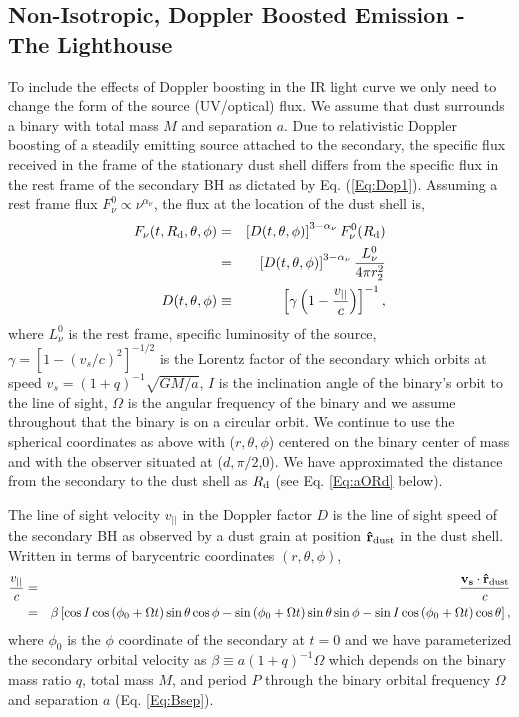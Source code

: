 \subsection{Non-Isotropic, Doppler Boosted Emission - The Lighthouse} 
To include the effects of Doppler boosting in the IR light
curve we only need to change the form of the source (UV/optical) flux. We assume that dust surrounds a
binary with total mass $M$ and separation $a$. Due to relativistic Doppler
boosting of a steadily emitting source attached to the secondary, the specific
flux received in the frame of the stationary dust shell differs from the
specific flux in the rest frame of the secondary BH as dictated by Eq.
(\ref{Eq:Dop1}). Assuming a rest frame flux $F^0_{\nu} \propto
\nu^{\alpha_{\nu}}$, the flux at the location of the dust shell is,
\begin{eqnarray}
F_{\nu}(t, R_{\rm{d}}, \theta, \phi) &=& \left[D(t, \theta, \phi)\right]^{3-\alpha_{\nu}} F^0_{\nu}(R_{\rm{d}})  \nonumber \\
&=&  \left[D(t, \theta, \phi)\right]^{3-\alpha_{\nu}} \frac{L^0_{\nu}}{4 \pi r^2_2}  \\ \nonumber
D(t, \theta, \phi) &\equiv& \left[ \gamma \left(1 - \frac{v_{||}}{c} \right) \right]^{-1},
\label{Eq:DopFlux}
\end{eqnarray}
where $L^0_{\nu}$ is the rest frame, specific luminosity of the source,
$\gamma = \left[ 1 - (v_s/c)^2 \right]^{-1/2}$ is the Lorentz factor of the
secondary which orbits at speed $v_s = (1+q)^{-1}\sqrt{GM/a}$, $I$ is the
inclination angle of the binary's orbit to the line of sight, $\Omega$ is the
angular frequency of the binary and we assume throughout that the binary is on
a circular orbit. We continue to use the spherical coordinates as above with
($r,\theta, \phi$) centered on the binary center of mass and with the observer
situated at ($d,\pi/2$,0). We have approximated the distance from the
secondary to the dust shell as $R_{\rm{d}}$ (see Eq. \ref{Eq:aORd} below).

The line of sight velocity $v_{||}$ in the Doppler factor $D$ is the line of
sight speed of the secondary BH as  observed by a dust grain at position
$\mathbf{\hat{r}}_{\rm{dust}}$ in the dust shell. Written in terms of
barycentric coordinates $(r,\theta, \phi)$,
\begin{eqnarray}
\frac{v_{||}}{c} &=& \frac{\mathbf{v_{s}} \cdot \mathbf{\hat{r}}_{\rm{dust}} }{c}\\ \nonumber 
& = & \beta  \left[ \cos{I} \cos{(\phi_0+\Omega t)} \sin{\theta}\cos{\phi} - \sin{(\phi_0+\Omega t)} \sin{\theta}\sin{\phi} - \sin{I} \cos{(\phi_0+\Omega t)} \cos{\theta}  \right],
\label{Eq:vlos}
\end{eqnarray}
where $\phi_0$ is the $\phi$ coordinate of the secondary at $t=0$ and we have
parameterized the secondary orbital velocity as $\beta \equiv a (1+q)^{-1}
\Omega$ which depends on the binary mass ratio $q$, total mass $M$, and period
$P$ through the binary orbital frequency $\Omega$ and separation $a$ (Eq. \ref{Eq:Bsep}).



